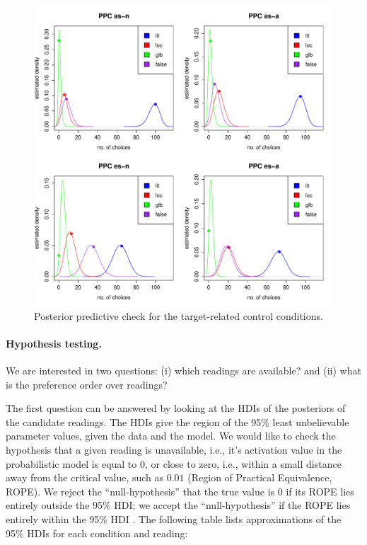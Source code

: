 \documentclass[fleqn,reqno,10pt]{article}
\begin{document}
\begin{figure}
  \centering
  \includegraphics[width=\textwidth]{pics/PPC_T.pdf}
  \caption{Posterior predictive check for the target-related control
    conditions.}
  \label{fig:Posterior_T}
\end{figure}

\paragraph{Hypothesis testing.} We are interested in two questions:
(i) which readings are available? and (ii) what is the preference
order over readings?

The first question can be answered by looking at the HDIs of the
posteriors of the candidate readings. The HDIs give the region of the
95\% least unbelievable parameter values, given the data and the
model. We would like to check the hypothesis that a given reading is
unavailable, i.e., it's activation value in the probabilistic model is
equal to 0, or close to zero, i.e., within a small distance away from
the critical value, such as $0.01$ (Region of Practical Equivalence,
ROPE). We reject the ``null-hypothesis'' that the true value is 0 if
its ROPE lies entirely outside the 95\% HDI; we accept the
``null-hypothesis'' if the ROPE lies entirely within the 95\% HDI
\citep[][Ch.~12]{Kruschke2011:Doing-Bayesian-}. The following table
lists approximations of the 95\% HDIs for each condition and reading:
\end{document}
